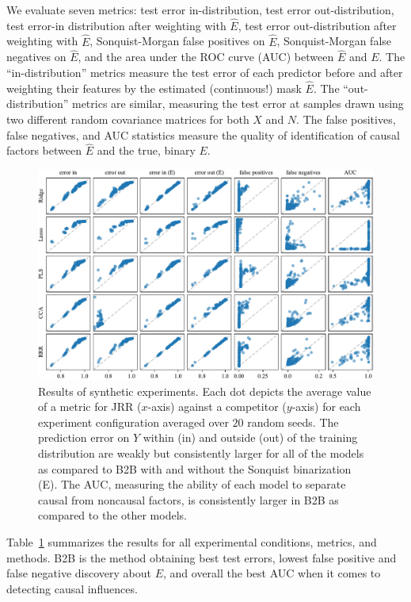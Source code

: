 We evaluate seven metrics:
%
test error in-distribution, test error out-distribution, test error-in distribution after weighting with $\hat{E}$, test error out-distribution after weighting with $\hat{E}$, Sonquist-Morgan false positives on $\hat{E}$, Sonquist-Morgan false negatives on $\hat{E}$, and the area under the ROC curve (AUC) between $\hat{E}$ and $E$.
%
The ``in-distribution'' metrics measure the test error of each predictor before and after weighting their features by the estimated (continuous!) mask $\hat{E}$.
%
The ``out-distribution'' metrics are similar, measuring the test error at samples drawn using two different random covariance matrices for both $X$ and $N$.
%
The false positives, false negatives, and AUC statistics measure the quality of identification of causal factors between $\hat{E}$ and the true, binary $E$.

\begin{figure}[htpb]
    \centering
    \includegraphics[width=\textwidth]{synthetic.pdf}
    \caption{Results of synthetic experiments. Each dot depicts the average value of a metric for JRR ($x$-axis) against a competitor ($y$-axis) for each experiment configuration averaged over $20$ random seeds. The prediction error on $Y$ within (in) and outside (out) of the training distribution are weakly but consistently larger for all of the models as compared to B2B with and without the Sonquist binarization (E). The AUC, measuring the ability of each model to separate causal from noncausal factors, is consistently larger in B2B as compared to the other models.}
    \label{table:synthetic}
\end{figure}

Table~\ref{table:synthetic} summarizes the results for all experimental conditions, metrics, and methods.
%
B2B is the method obtaining best test errors, lowest false positive and false negative discovery about $E$, and overall the best AUC when it comes to detecting causal influences.
